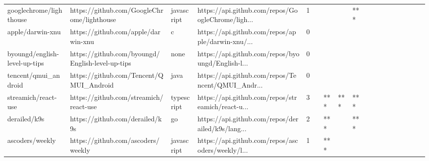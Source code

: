 \begin{tabular}{llllrlllllllllllll}
googlechrome/lighthouse                            &         https://github.com/GoogleChrome/lighthouse &        javascript &  https://api.github.com/repos/GoogleChrome/ligh... &       1 &         &        &           &            *** &                 &        &           &           &          &          &       &              &          \\
apple/darwin-xnu                                   &                https://github.com/apple/darwin-xnu &                 c &  https://api.github.com/repos/apple/darwin-xnu/... &       0 &         &        &           &                &                 &        &           &           &          &          &       &              &          \\
byoungd/english-level-up-tips                      &   https://github.com/byoungd/English-level-up-tips &              none &  https://api.github.com/repos/byoungd/English-l... &       0 &         &        &           &                &                 &        &           &           &          &          &       &              &          \\
tencent/qmui\_android                               &            https://github.com/Tencent/QMUI\_Android &              java &  https://api.github.com/repos/Tencent/QMUI\_Andr... &       0 &         &        &           &                &                 &        &           &           &          &          &       &              &          \\
streamich/react-use                                &             https://github.com/streamich/react-use &        typescript &  https://api.github.com/repos/streamich/react-u... &       3 &         &    *** &       *** &            *** &                 &        &           &           &          &          &       &              &          \\
derailed/k9s                                       &                    https://github.com/derailed/k9s &                go &  https://api.github.com/repos/derailed/k9s/lang... &       2 &         &    *** &           &            *** &                 &        &           &           &          &          &       &              &          \\
ascoders/weekly                                    &                 https://github.com/ascoders/weekly &        javascript &  https://api.github.com/repos/ascoders/weekly/l... &       1 &         &    *** &           &                &                 &        &           &           &          &          &       &              &          \\

\end{tabular}
